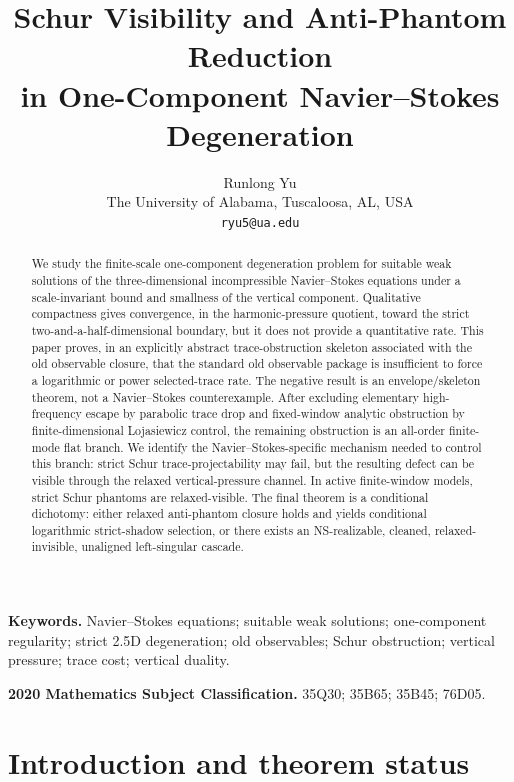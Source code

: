 \documentclass[11pt]{article}
\title{\textbf{Schur Visibility and Anti-Phantom Reduction\\
		in One-Component Navier--Stokes Degeneration}}
\author{Runlong Yu\\
	The University of Alabama, Tuscaloosa, AL, USA\\
	\texttt{ryu5@ua.edu}}
\date{}
\numberwithin{equation}{section}
\begin{document}
\maketitle

\begin{abstract}
We study the finite-scale one-component degeneration problem for suitable weak solutions of the three-dimensional incompressible Navier--Stokes equations under a scale-invariant bound and smallness of the vertical component. Qualitative compactness gives convergence, in the harmonic-pressure quotient, toward the strict two-and-a-half-dimensional boundary, but it does not provide a quantitative rate. This paper proves, in an explicitly abstract trace-obstruction skeleton associated with the old observable closure, that the standard old observable package is insufficient to force a logarithmic or power selected-trace rate. The negative result is an envelope/skeleton theorem, not a Navier--Stokes counterexample. After excluding elementary high-frequency escape by parabolic trace drop and fixed-window analytic obstruction by finite-dimensional Lojasiewicz control, the remaining obstruction is an all-order finite-mode flat branch. We identify the Navier--Stokes-specific mechanism needed to control this branch: strict Schur trace-projectability may fail, but the resulting defect can be visible through the relaxed vertical-pressure channel. In active finite-window models, strict Schur phantoms are relaxed-visible. The final theorem is a conditional dichotomy: either relaxed anti-phantom closure holds and yields conditional logarithmic strict-shadow selection, or there exists an NS-realizable, cleaned, relaxed-invisible, unaligned left-singular cascade.
\end{abstract}

\noindent\textbf{Keywords.} Navier--Stokes equations; suitable weak solutions; one-component regularity; strict 2.5D degeneration; old observables; Schur obstruction; vertical pressure; trace cost; vertical duality.

\medskip

\noindent\textbf{2020 Mathematics Subject Classification.} 35Q30; 35B65; 35B45; 76D05.

\tableofcontents


\section{Introduction and theorem status}
\end{document}
